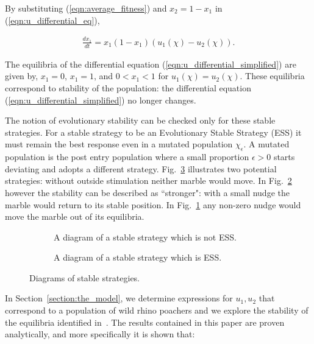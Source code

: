 \documentclass[10pt]{article}
\begin{document}
\noindent{} By substituting (\ref{eqn:average_fitness}) and \(x_2= 1 - x_1\) 
in (\ref{eqn:u_differential_eq}),

\begin{eqnarray}
    \label{eqn:u_differential_simplified}
    \frac{dx_1}{dt}= x_1(1 - x_1)(u_1(\chi) - u_2(\chi)).
\end{eqnarray}

The equilibria of the differential equation (\ref{eqn:u_differential_simplified})
are given by, \(x_1=0\), \(x_1=1\), and \(0<x_1<1\) for \(u_1(\chi)=u_2(\chi)\).
These equilibria correspond to stability of the population: the differential 
equation (\ref{eqn:u_differential_simplified}) no longer changes. 

The notion of evolutionary stability can be checked only for these stable strategies.
For a stable strategy to be an Evolutionary Stable Strategy (ESS) it must remain
the best response even in a mutated population \(\chi_\epsilon\). A mutated population
is the post entry population 
where a small proportion \(\epsilon > 0\) starts deviating and adopts a different strategy.
Fig.~\ref{fig:stable_ess_driagrams} illustrates two potential strategies: without
outside stimulation neither marble would move. In Fig.~\ref{fig:ess_diagram}
however the stability can be described as ``stronger": with a small nudge the marble
would return to its stable position. In Fig.~\ref{fig:stable_diagram} any non-zero
nudge would move the marble out of its equilibria.

\begin{figure}[!htbp]
\begin{center}
    \begin{subfigure}{0.40\textwidth}
    
    \caption{\label{fig:stable_diagram} A diagram of a stable strategy which 
    is not ESS.}
    \end{subfigure}
    \begin{subfigure}{0.40\textwidth}
    
    \caption{\label{fig:ess_diagram}A diagram of a stable strategy which is ESS.}
    \end{subfigure}
        \caption{\label{fig:stable_ess_driagrams} Diagrams of stable strategies.}
\end{center}
\end{figure}

In Section~\ref{section:the_model}, we determine expressions
for \(u_1, u_2\) that correspond to a population of wild rhino poachers and we
explore the stability of the equilibria identified in~\citep{Lee}. The results
contained in this paper are proven analytically, and more specifically it is 
shown that:
\end{document}
